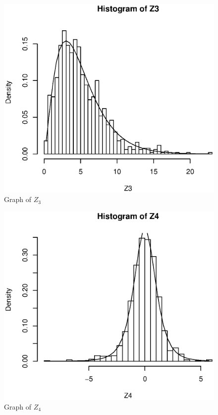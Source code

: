 \documentclass[a4paper,11pt,fleqn]{article}
\begin{document}
\begin{figure}[h!]
\centering
\includegraphics[scale=0.8]{Z3.eps}
\caption{Graph of $Z_3$}
\label{fig: $Z_3$}
\end{figure}
\vskip 0.5cm

\begin{figure}[h!]
\centering
\includegraphics[scale=0.8]{Z4.eps}
\caption{Graph of $Z_4$}
\label{fig: $Z_4$}
\end{figure}
\end{document}
